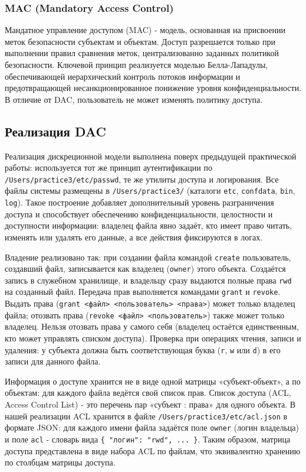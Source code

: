 \documentclass[areasetadvanced]{scrartcl}
\begin{document}
\subsubsection{MAC (Mandatory Access Control)}
Мандатное управление доступом (MAC) - модель, основанная на присвоении меток безопасности субъектам и объектам. Доступ разрешается только при выполнении правил сравнения меток, централизованно заданных политикой безопасности. Ключевой принцип реализуется моделью Белла-Лападулы, обеспечивающей иерархический контроль потоков информации и предотвращающей несанкционированное понижение уровня конфиденциальности. В отличие от DAC, пользователь не может изменять политику доступа.

\subsection{Реализация DAC}

Реализация дискреционной модели выполнена поверх предыдущей практической работы: используется тот же принцип аутентификации по \texttt{/Users/practice3/etc/passwd}, те же утилиты доступа и логирования. Все файлы системы размещены в \texttt{/Users/practice3/} (каталоги \texttt{etc}, \texttt{confdata}, \texttt{bin}, \texttt{log}). Такое построение добавляет дополнительный уровень разграничения доступа и способствует обеспечению конфиденциальности, целостности и доступности информации: владелец файла явно задаёт, кто имеет право читать, изменять или удалять его данные, а все действия фиксируются в логах.

Владение реализовано так: при создании файла командой \texttt{create} пользователь, создавший файл, записывается как владелец (\texttt{owner}) этого объекта. Создаётся запись в служебном хранилище, и владельцу сразу выдаются полные права \texttt{rwd} на созданный файл. Передача прав выполняется командами \texttt{grant} и \texttt{revoke}. Выдать права (\texttt{grant <файл> <пользователь> <права>}) может только владелец файла; отозвать права (\texttt{revoke <файл> <пользователь>}) также может только владелец. Нельзя отозвать права у самого себя (владелец остаётся единственным, кто может управлять списком доступа). Проверка при операциях чтения, записи и удаления: у субъекта должна быть соответствующая буква (\texttt{r}, \texttt{w} или \texttt{d}) в его записи для данного файла.

Информация о доступе хранится не в виде одной матрицы «субъект-объект», а по объектам: для каждого файла ведётся свой список прав. Список доступа (ACL, Access Control List) - это перечень пар «субъект : права» для одного объекта. В нашей реализации ACL хранится в файле \texttt{/Users/practice3/etc/acl.json} в формате JSON: для каждого имени файла задаётся поле \texttt{owner} (логин владельца) и поле \texttt{acl} - словарь вида \texttt{\{ "логин": "rwd", ... \}}. Таким образом, матрица доступа представлена в виде набора ACL по файлам, что эквивалентно хранению по столбцам матрицы доступа.
\end{document}
